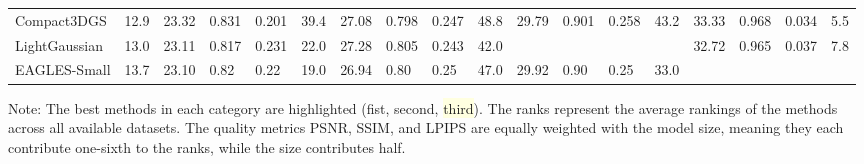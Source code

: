 {\begin{adjustbox}{center}
\begin{tabular}{ll|llll|llll|llll|llll}
Compact3DGS & 12.9 & 23.32 & 0.831 & 0.201 & 39.4 & 27.08 & 0.798 & 0.247 & 48.8 & 29.79 & 0.901 & 0.258 & 43.2 & 33.33 & 0.968 & 0.034 & 5.5 \\
LightGaussian & 13.0 & 23.11 & 0.817 & 0.231 & 22.0 & 27.28 & 0.805 & 0.243 & 42.0 &  &  &  &  & 32.72 & 0.965 & 0.037 & 7.8 \\
EAGLES-Small & 13.7 & 23.10 & 0.82 & 0.22 & 19.0 & 26.94 & 0.80 & 0.25 & 47.0 & 29.92 & 0.90 & \cellcolor{lightorange}0.25 & 33.0 &  &  &  &  \\
\bottomrule
\end{tabular}
\end{adjustbox}
\newline\newline
\noindent Note: The best methods in each category are highlighted (\colorbox{lightred}{fist}, \colorbox{lightorange}{second}, \colorbox{lightyellow}{third}). The ranks represent the average rankings of the methods across all available datasets. The quality metrics PSNR, SSIM, and LPIPS are equally weighted with the model size, meaning they each contribute one-sixth to the ranks, while the size contributes half.
}